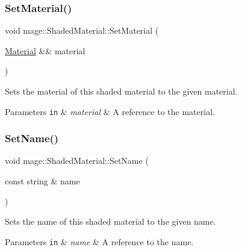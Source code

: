 \subsubsection{\texorpdfstring{Set\+Material()}{SetMaterial()}\hspace{0.1cm}{\footnotesize\ttfamily [2/2]}}
{\footnotesize\ttfamily void mage\+::\+Shaded\+Material\+::\+Set\+Material (\begin{DoxyParamCaption}\item[{\hyperlink{structmage_1_1_material}{Material} \&\&}]{material }\end{DoxyParamCaption})}

Sets the material of this shaded material to the given material.


\begin{DoxyParams}[1]{Parameters}
\mbox{\tt in}  & {\em material} & A reference to the material. \\
\hline
\end{DoxyParams}
\hypertarget{structmage_1_1_shaded_material_a3f8d05c818362ef37bfcf9a02769d0ff}{}\label{structmage_1_1_shaded_material_a3f8d05c818362ef37bfcf9a02769d0ff} 
\subsubsection{\texorpdfstring{Set\+Name()}{SetName()}\hspace{0.1cm}{\footnotesize\ttfamily [1/2]}}
{\footnotesize\ttfamily void mage\+::\+Shaded\+Material\+::\+Set\+Name (\begin{DoxyParamCaption}\item[{const string \&}]{name }\end{DoxyParamCaption})}

Sets the name of this shaded material to the given name.


\begin{DoxyParams}[1]{Parameters}
\mbox{\tt in}  & {\em name} & A reference to the name. \\
\hline
\end{DoxyParams}
\hypertarget{structmage_1_1_shaded_material_aa2a120f4df21d5fbde733ce12a348571}{}\label{structmage_1_1_shaded_material_aa2a120f4df21d5fbde733ce12a348571} 
